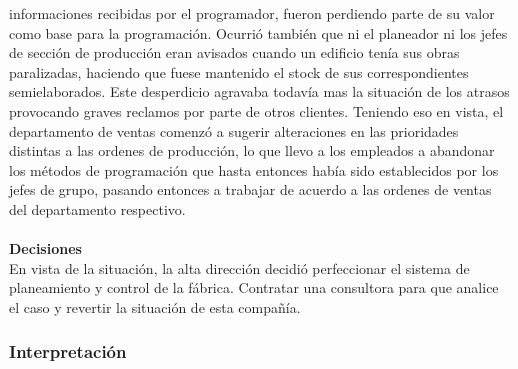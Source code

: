 \documentclass[a4paper,10pt,titlepage]{article}
\begin{document}
informaciones recibidas por el programador, fueron perdiendo parte de su valor como
base para la programaci\'on. Ocurri\'o tambi\'en que ni el planeador ni los jefes de secci\'on
de producci\'on eran avisados cuando un edificio ten\'ia sus obras paralizadas, haciendo
que fuese mantenido el stock de sus correspondientes semielaborados. Este
desperdicio agravaba todav\'ia mas la situaci\'on de los atrasos provocando graves
reclamos por parte de otros clientes. Teniendo eso en vista, el departamento de ventas
comenz\'o a sugerir alteraciones en las prioridades distintas a las ordenes de
producci\'on, lo que llevo a los empleados a abandonar los m\'etodos de programaci\'on
que hasta entonces hab\'ia sido establecidos por los jefes de grupo, pasando entonces a
trabajar de acuerdo a las ordenes de ventas del departamento respectivo.\\ \\
\textbf{Decisiones}\\
En vista de la situaci\'on, la alta direcci\'on decidi\'o perfeccionar el sistema de
planeamiento y control de la f\'abrica.
Contratar una consultora para que analice el caso y revertir la situaci\'on de esta compa\~n\'ia.



\newpage
\subsubsection{Interpretaci\'on}
\end{document}
